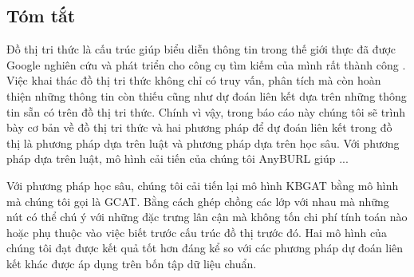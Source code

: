 \begin{center}
\begingroup
\section*{Tóm tắt}
\label{chap:Abstract}

\begin{adjustwidth}{1.5cm}{1.5cm}
	Đồ thị tri thức là cấu trúc giúp biểu diễn thông tin trong thế giới thực đã được Google nghiên cứu và phát triển cho công cụ tìm kiếm của mình rất thành công \cite{googlekg:2020}. Việc khai thác đồ thị tri thức không chỉ có truy vấn, phân tích mà còn hoàn thiện những thông tin còn thiếu cũng như dự đoán liên kết dựa trên những thông tin sẵn có trên đồ thị tri thức. Chính vì vậy, trong báo cáo này chúng tôi sẽ trình bày cơ bản về đồ thị tri thức và hai phương pháp để dự đoán liên kết trong đồ thị là phương pháp dựa trên luật và phương pháp dựa trên học sâu.
	Với phương pháp dựa trên luật, mô hình cải tiến của chúng tôi AnyBURL giúp ... 
	
	Với phương pháp học sâu, chúng tôi cải tiến lại mô hình KBGAT bằng mô hình mà chúng tôi gọi là GCAT. Bằng cách ghép chồng các lớp với nhau mà những nút có thể chú ý với những đặc trưng lân cận mà không tốn chi phí tính toán nào hoặc phụ thuộc vào việc biết trước cấu trúc đồ thị trước đó.
	Hai mô hình của chúng tôi đạt được kết quả tốt hơn đáng kể so với các phương pháp dự đoán liên kết khác được áp dụng trên bốn tập dữ liệu chuẩn.
\end{adjustwidth}
\endgroup
\end{center}